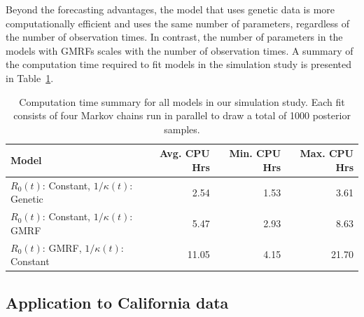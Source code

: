 Beyond the forecasting advantages, the model that uses genetic data is more computationally efficient and uses the same number of parameters, regardless of the number of observation times.
In contrast, the number of parameters in the models with GMRFs scales with the number of observation times.
A summary of the computation time required to fit models in the simulation study is presented in Table~\ref{ch_5:table:simmulation_study_cpu_time}.

\begin{table}
\caption[Computation time for models in simulation study.]{Computation time summary for all models in our simulation study.
Each fit consists of four Markov chains run in parallel to draw a total of 1000 posterior samples.}
\label{ch_5:table:simmulation_study_cpu_time}
\centering
\begin{tabular}{lrrr}
 Model & Avg. CPU Hrs & Min. CPU Hrs & Max. CPU Hrs \\ 
  \hline
\( R_0(t) \): Constant, \( 1 / \kappa(t) \): Genetic & 2.54 & 1.53 & 3.61 \\ 
\( R_0(t) \): Constant, \( 1 / \kappa(t) \): GMRF & 5.47 & 2.93 & 8.63 \\ 
\( R_0(t) \): GMRF, \( 1 / \kappa(t) \): Constant & 11.05 & 4.15 & 21.70
\end{tabular}
\end{table}

\subsection{Application to California data}
\label{ch_5:subsec:application}


